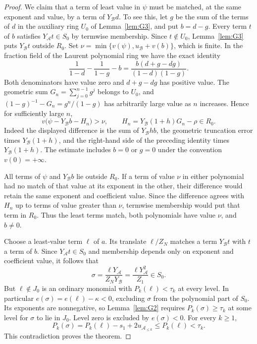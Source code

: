 \documentclass[11pt, letterpaper]{article}
\theoremstyle{definition}
\theoremstyle{remark}
\begin{document}
\begin{proof}
    We claim that a term of least value in $\psi$ must be matched, at the same exponent and value, by a term of $Y_{\mathcal{B}}d$.
    To see this, let $g$ be the sum of the terms of $d$ in the auxiliary ring $U_{0}$ of Lemma~\ref{lem:G3}, and put $b = d - g$.
    Every term $t$ of $b$ satisfies $Y_{\mathcal{A}}t \in S_{0}$ by termwise membership.
    Since $t \notin U_{0}$, Lemma~\ref{lem:G3} puts $Y_{\mathcal{B}}t$ outside $R_{0}$.
    Set $\nu = \min\{v(\psi), u_{\mathcal{B}} + v(b)\}$, which is finite.
    In the fraction field of the Laurent polynomial ring we have the exact identity
    \[
        \frac{1}{1 - d} - \frac{1}{1 - g} - b
        = \frac{b(d + g - dg)}{(1 - d)(1 - g)}.
    \]
    Both denominators have value zero and $d + g - dg$ has positive value.
    The geometric sum $G_{n} = \sum_{j = 0}^{n - 1}g^{j}$ belongs to $U_{0}$, and $(1 - g)^{-1} - G_{n} = g^{n}/(1 - g)$ has arbitrarily large value as $n$ increases.
    Hence for sufficiently large $n$,
    \[
        v\bigl(\psi - Y_{\mathcal{B}}b - H_{n}\bigr) > \nu,
        \qquad H_{n} = Y_{\mathcal{B}}(1 + h)G_{n} - \rho \in R_{0}.
    \]
    Indeed the displayed difference is the sum of $Y_{\mathcal{B}}hb$, the geometric truncation error times $Y_{\mathcal{B}}(1 + h)$, and the right-hand side of the preceding identity times $Y_{\mathcal{B}}(1 + h)$.
    The estimate includes $b = 0$ or $g = 0$ under the convention $v(0) = +\infty$.

    All terms of $\psi$ and $Y_{\mathcal{B}}b$ lie outside $R_{0}$.
    If a term of value $\nu$ in either polynomial had no match of that value at its exponent in the other, their difference would retain the same exponent and coefficient value.
    Since the difference agrees with $H_{n}$ up to terms of value greater than $\nu$, termwise membership would put that term in $R_{0}$.
    Thus the least terms match, both polynomials have value $\nu$, and $b \ne 0$.

    Choose a least-value term $\ell$ of $a$.
    Its translate $\ell/Z_{N}$ matches a term $Y_{\mathcal{B}}t$ with $t$ a term of $b$.
    Since $Y_{\mathcal{A}}t \in S_{0}$ and membership depends only on exponent and coefficient value, it follows that
    \[
        \sigma = \frac{\ell Y_{\mathcal{A}}}{Z_{N}Y_{\mathcal{B}}}
        = \frac{\ell Y_{\mathcal{A}}^{2}}{Z_{1}} \in S_{0}.
    \]
    But $\ell \notin J_{0}$ is an ordinary monomial with $P_{k}(\ell) < \tau_{k}$ at every level.
    In particular $e(\sigma) = e(\ell) - \kappa < 0$, excluding $\sigma$ from the polynomial part of $S_{0}$.
    Its exponents are nonnegative, so Lemma~\ref{lem:G2} requires $P_{k}(\sigma) \ge \tau_{k}$ at some level for $\sigma$ to lie in $J_{0}$.
    Level zero is excluded by $e(\sigma) < 0$.
    For every $k \ge 1$,
    \[
        P_{k}(\sigma) = P_{k}(\ell) - s_{1} + 2u_{\mathcal{A}_{\le k}}
        \le P_{k}(\ell) < \tau_{k}.
    \]
    This contradiction proves the theorem.
\end{proof}
\end{document}

